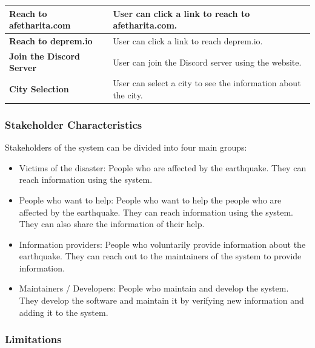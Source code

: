 \documentclass[a4paper]{article}
\begin{document}
\begin{table}[H]
{\begin{tabular}{|l|l|}
                    \textbf{Reach to afetharita.com} & User can click a link to reach to afetharita.com. \\ \hline
                    \textbf{Reach to deprem.io} & User can click a link to reach deprem.io. \\ \hline
                    \textbf{Join the Discord Server} & User can join the Discord server using the website. \\ \hline
                    \textbf{City Selection} & User can select a city to see the information about the city. \\ \hline
                    \end{tabular}%
                    }
                \end{table}
                \vspace{1cm}

                \subsubsection{Stakeholder Characteristics}

                Stakeholders of the system can be divided into four main groups:
                \begin{itemize}
                    \item Victims of the disaster: People who are affected by the earthquake. They can reach information using the system.
                    \item People who want to help: People who want to help the people who are affected by the earthquake. They can reach information using the system. They can also share the information of their help.
                    \item Information providers: People who voluntarily provide information about the earthquake. They can reach out to the maintainers of the system to provide information.
                    \item Maintainers / Developers: People who maintain and develop the system. They develop the software and maintain it by verifying new information and adding it to the system.
                \end{itemize}

                \subsubsection{Limitations}
\end{document}
